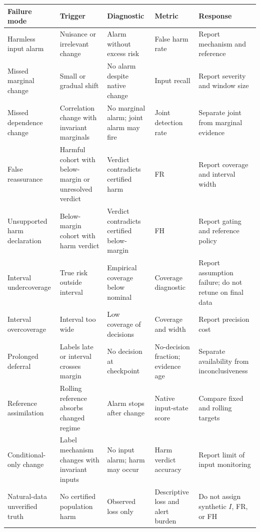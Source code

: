 \documentclass[
]{article}
\begin{document}
\begin{longtable}[]{@{}
  >{\raggedright\arraybackslash}p{}
  >{\raggedright\arraybackslash}p{}
  >{\raggedright\arraybackslash}p{}
  >{\raggedright\arraybackslash}p{}
  >{\raggedright\arraybackslash}p{}@{}}
\toprule
Failure mode & Trigger & Diagnostic & Metric & Response \\
\midrule
\endhead
Harmless input alarm & Nuisance or irrelevant change & Alarm without
excess risk & False harm rate & Report mechanism and reference \\
Missed marginal change & Small or gradual shift & No alarm despite
native change & Input recall & Report severity and window size \\
Missed dependence change & Correlation change with invariant marginals &
No marginal alarm; joint alarm may fire & Joint detection rate &
Separate joint from marginal evidence \\
False reassurance & Harmful cohort with below-margin or unresolved
verdict & Verdict contradicts certified harm & FR & Report coverage and
interval width \\
Unsupported harm declaration & Below-margin cohort with harm verdict &
Verdict contradicts certified below-margin & FH & Report gating and
reference policy \\
Interval undercoverage & True risk outside interval & Empirical coverage
below nominal & Coverage diagnostic & Report assumption failure; do not
retune on final data \\
Interval overcoverage & Interval too wide & Low coverage of decisions &
Coverage and width & Report precision cost \\
Prolonged deferral & Labels late or interval crosses margin & No
decision at checkpoint & No-decision fraction; evidence age & Separate
availability from inconclusiveness \\
Reference assimilation & Rolling reference absorbs changed regime &
Alarm stops after change & Native input-state score & Compare fixed and
rolling targets \\
Conditional-only change & Label mechanism changes with invariant inputs
& No input alarm; harm may occur & Harm verdict accuracy & Report limit
of input monitoring \\
Natural-data unverified truth & No certified population harm & Observed
loss only & Descriptive loss and alert burden & Do not assign synthetic
\(I\), FR, or FH \\
\bottomrule
\end{longtable}
\end{document}
